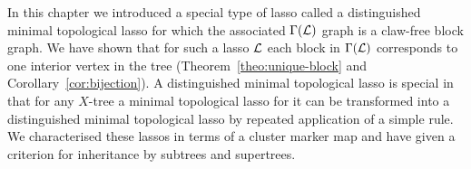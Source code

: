 In this chapter we introduced a special type of lasso called a distinguished
minimal topological lasso for which the associated $\Gamma({\mathcal L})$ graph is a
claw-free block graph.  We have shown that for such a lasso ${\mathcal L}$ each block
in $\Gamma({\mathcal L})$ corresponds to one interior vertex in the tree
(Theorem~\ref{theo:unique-block} and Corollary~\ref{cor:bijection}).  A
distinguished minimal topological lasso is special in that for any $X$-tree a
minimal topological lasso for it can be transformed into a distinguished
minimal topological lasso by repeated application of a simple rule.  We
characterised these lassos in terms of a cluster marker map and have given a
criterion for inheritance by subtrees and supertrees.

